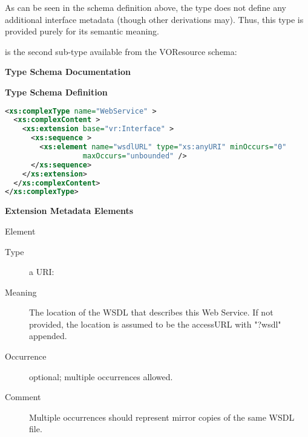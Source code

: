 \documentclass[11pt,a4paper]{ivoa}
\begin{document}
As can be seen in the schema definition above, the
 type does not define any additional
interface metadata (though other  derivations
may).  Thus, this type is provided purely for its semantic meaning.



 is the second 
sub-type available from the VOResource schema:

\begin{generated}
\begingroup
        \renewcommand*\descriptionlabel[1]{%
        \hbox to 5.5em{\emph{#1}\hfil}}\vspace{2ex}\noindent\textbf{ Type Schema Documentation}



\vspace{1ex}\noindent\textbf{ Type Schema Definition}

\begin{lstlisting}[language=XML,basicstyle=\footnotesize]
<xs:complexType name="WebService" >
  <xs:complexContent >
    <xs:extension base="vr:Interface" >
      <xs:sequence >
        <xs:element name="wsdlURL" type="xs:anyURI" minOccurs="0"
                  maxOccurs="unbounded" />
      </xs:sequence>
    </xs:extension>
  </xs:complexContent>
</xs:complexType>
\end{lstlisting}

\vspace{0.5ex}\noindent\textbf{ Extension Metadata Elements}

\begingroup\small\begin{bigdescription}\item[Element \xmlel{wsdlURL}]
\begin{description}
\item[Type] a URI: 
\item[Meaning]
                        The location of the WSDL that describes this
                        Web Service.  If not provided, the location is
                        assumed to be the accessURL with {"}?wsdl{"} appended.

\item[Occurrence] optional; multiple occurrences allowed.
\item[Comment]
                        Multiple occurrences should represent mirror copies of
                        the same WSDL file.


\end{description}


\end{bigdescription}\endgroup

\endgroup
\end{generated}
\end{document}
